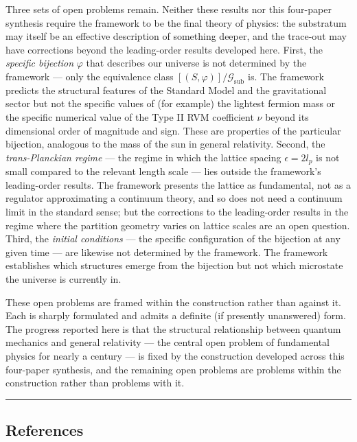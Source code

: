 \documentclass[
]{article}
\begin{document}
Three sets of open problems remain. Neither these results nor this
four-paper synthesis require the framework to be the final theory of
physics: the substratum may itself be an effective description of
something deeper, and the trace-out may have corrections beyond the
leading-order results developed here. First, the \emph{specific
bijection} \(\varphi\) that describes our universe is not determined by
the framework --- only the equivalence class
\([(S, \varphi)]/\mathcal{G}_{\text{sub}}\) is. The framework predicts
the structural features of the Standard Model and the gravitational
sector but not the specific values of (for example) the lightest fermion
mass or the specific numerical value of the Type II RVM coefficient
\(\nu\) beyond its dimensional order of magnitude and sign. These are
properties of the particular bijection, analogous to the mass of the sun
in general relativity. Second, the \emph{trans-Planckian regime} --- the
regime in which the lattice spacing \(\epsilon = 2 l_p\) is not small
compared to the relevant length scale --- lies outside the framework's
leading-order results. The framework presents the lattice as
fundamental, not as a regulator approximating a continuum theory, and so
does not need a continuum limit in the standard sense; but the
corrections to the leading-order results in the regime where the
partition geometry varies on lattice scales are an open question. Third,
the \emph{initial conditions} --- the specific configuration of the
bijection at any given time --- are likewise not determined by the
framework. The framework establishes which structures emerge from the
bijection but not which microstate the universe is currently in.

These open problems are framed within the construction rather than
against it. Each is sharply formulated and admits a definite (if
presently unanswered) form. The progress reported here is that the
structural relationship between quantum mechanics and general relativity
--- the central open problem of fundamental physics for nearly a century
--- is fixed by the construction developed across this four-paper
synthesis, and the remaining open problems are problems within the
construction rather than problems with it.

\begin{center}\rule{0.5\linewidth}{0.5pt}\end{center}

\hypertarget{references}{%
\subsection{References}\label{references}}
\end{document}
